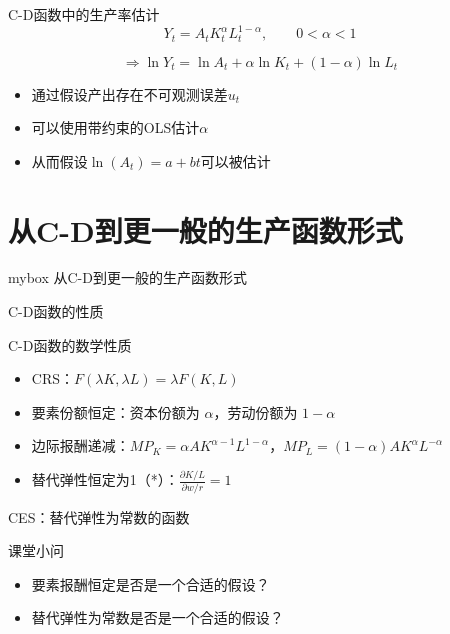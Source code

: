 \documentclass[aspectratio=32]{beamer}
\begin{document}
\begin{frame}{C-D函数中的生产率估计}
\[
Y_t=A_tK_t^\alpha L_t^{1-\alpha},
\qquad 0<\alpha<1
\]

\[
\Longrightarrow \ln Y_t=\ln A_t+\alpha\ln K_t+(1-\alpha)\ln L_t
\]

\begin{itemize}
    \item 通过假设产出存在不可观测误差\(u_t\)
    \item 可以使用带约束的OLS估计\(\alpha\)
    \item 从而假设\(\ln(A_t)=a+bt\)可以被估计
\end{itemize}
\end{frame}

\section{从C-D到更一般的生产函数形式}
\begin{frame}
\begin{center}
    \begin{minipage}{1\textwidth}
		\begin{beamercolorbox}[wd=0.7\textwidth, rounded=true, shadow=true]{mybox}
			\LARGE \centering 从C-D到更一般的生产函数形式
		\end{beamercolorbox}
    \end{minipage}
\end{center} 
\end{frame}

\begin{frame}{C-D函数的性质}
\begin{block}{C-D函数的数学性质}
\begin{itemize}
    \item CRS：$F(\lambda K,\lambda L)=\lambda F(K,L)$
    \item 要素份额恒定：资本份额为 $\alpha$，劳动份额为 $1-\alpha$
    \item 边际报酬递减：$MP_K=\alpha A K^{\alpha-1}L^{1-\alpha}$，$MP_L=(1-\alpha)A K^\alpha L^{-\alpha}$
    \item 替代弹性恒定为1（*）：\(\frac{\partial K/L}{\partial w/r}=1\)
\end{itemize}
\end{block}
\end{frame}

\begin{frame}{CES：替代弹性为常数的函数}
\begin{block}{课堂小问}
\begin{itemize}
    \item 要素报酬恒定是否是一个合适的假设？
    \item 替代弹性为常数是否是一个合适的假设？
\end{itemize}
\end{block}
\end{frame}
\end{document}
